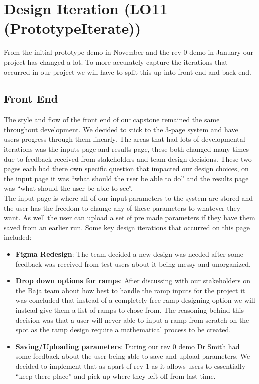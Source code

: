 \documentclass{article}
\begin{document}
\section{Design Iteration (LO11 (PrototypeIterate))}

\noindent From the initial prototype demo in November and the rev 0 demo in January our project has changed a lot. To more accurately capture the iterations that occurred in our project we will have to split this up into front end and back end.
\subsection{Front End}

\noindent The style and flow of the front end of our capstone remained the same throughout development. We decided to stick to the 3-page system and have users progress through them linearly. The areas that had lots of developmental iterations was the inputs page and results page, 
these both changed many times due to feedback received from stakeholders and team design decisions. These two pages each had there own specific question that impacted our design choices, 
on the input page it was “what should the user be able to do” and the results page was “what should the user be able to see”.\\

\noindent The input page is where all of our input parameters to the system are stored and the user has the freedom to change any of these parameters to whatever they want. As well the user can upload a set of pre made parameters if they have them saved from an earlier run. 
Some key design iterations that occurred on this page included:\\

\begin{itemize}
    \item \textbf{Figma Redesign}: The team decided a new design was needed after some feedback was received from test users about it being messy and unorganized.
    \item \textbf{Drop down options for ramps}: After discussing with our stakeholders on the Baja team about how best to handle the ramp inputs for the project it was concluded that instead of a completely free ramp designing option we will instead give them a list of ramps to chose from. The reasoning behind this decision was that a user will never able to input a ramp from scratch on the spot as the ramp design require a mathematical process to be created.
    \item \textbf{Saving/Uploading parameters}: During our rev 0 demo Dr Smith had some feedback about the user being able to save and upload parameters. We decided to implement that as apart of rev 1 as it allows users to essentially “keep there place” and pick up where they left off from last time.
\end{itemize}
\end{document}
